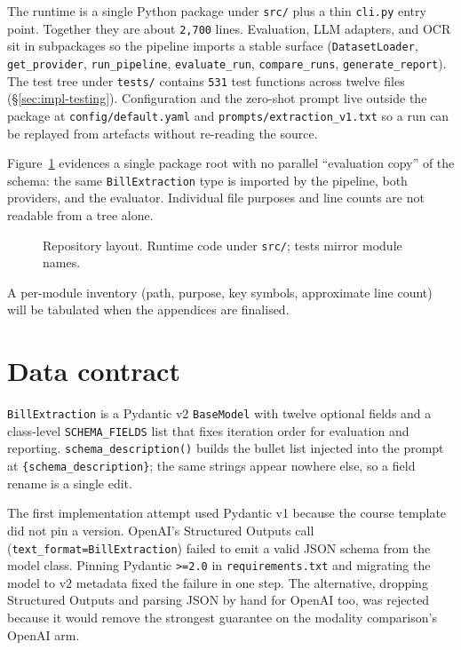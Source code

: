 The runtime is a single Python package under \texttt{src/} plus a
thin \texttt{cli.py} entry point. Together they are about
\texttt{2,700} lines. Evaluation, LLM adapters, and OCR sit in
subpackages so the pipeline imports a stable surface
(\texttt{DatasetLoader}, \texttt{get\_provider}, \texttt{run\_pipeline},
\texttt{evaluate\_run}, \texttt{compare\_runs},
\texttt{generate\_report}). The test tree under \texttt{tests/}
contains \texttt{531} test functions across twelve files
(\S\ref{sec:impl-testing}). Configuration and the zero-shot prompt
live outside the package at \texttt{config/default.yaml} and
\texttt{prompts/extraction\_v1.txt} so a run can be replayed from
artefacts without re-reading the source.

Figure~\ref{fig:impl-tree} evidences a single package root with no
parallel ``evaluation copy'' of the schema: the same
\texttt{BillExtraction} type is imported by the pipeline, both
providers, and the evaluator. Individual file purposes and line
counts are not readable from a tree alone.

\begin{figure}[ht]
    \centering
    \caption{Repository layout. Runtime code under \texttt{src/};
    tests mirror module names.}
    \label{fig:impl-tree}
\end{figure}

A per-module inventory (path, purpose, key symbols, approximate
line count) will be tabulated when the appendices are finalised.

\section{Data contract}
\label{sec:impl-schema}

\texttt{BillExtraction} is a Pydantic v2 \texttt{BaseModel} with
twelve optional fields and a class-level \texttt{SCHEMA\_FIELDS}
list that fixes iteration order for evaluation and reporting.
\texttt{schema\_description()} builds the bullet list injected into
the prompt at \texttt{\{schema\_description\}}; the same strings
appear nowhere else, so a field rename is a single edit.

The first implementation attempt used Pydantic v1 because the
course template did not pin a version. OpenAI's Structured Outputs
call (\texttt{text\_format=BillExtraction}) failed to emit a valid
JSON schema from the model class. Pinning Pydantic
\texttt{\textgreater=2.0} in \texttt{requirements.txt} and
migrating the model to v2 metadata fixed the failure in one step.
The alternative, dropping Structured Outputs and parsing JSON by
hand for OpenAI too, was rejected because it would remove the
strongest guarantee on the modality comparison's OpenAI arm.

